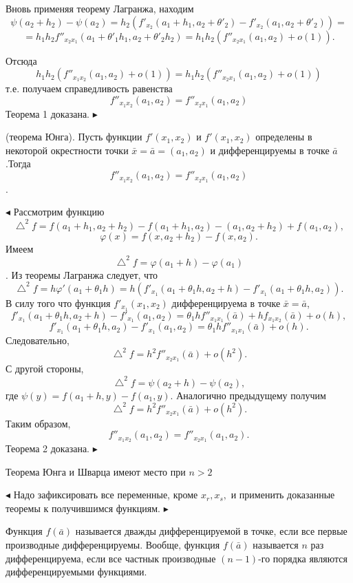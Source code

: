 \parindent=1cm
Вновь применяя теорему Лагранжа, находим
$$\psi (a_2+h_2)-\psi (a_2)=h_2(f'_{x_2}(a_1+h_1,a_2+\theta'_2)-f'_{x_2}(a_1,a_2+\theta'_2))=$$
$$=h_1 h_2 f''_{{x_2}{x_1}}(a_1+\theta'_1 h_1,a_2+\theta'_2 h_2)=h_1 h_2(f''_{{x_2}{x_1}}(a_1,a_2)+o(1)).$$

Отсюда
$$h_1 h_2(f''_{{x_1}{x_2}}(a_1, a_2)+o(1))=h_1 h_2(f''_{{x_2}{x_1}}(a_1, a_2)+o(1))$$
т.е. получаем справедливость равенства
$$f''_{{x_1}{x_2}}(a_1, a_2)=f''_{{x_2}{x_1}}(a_1, a_2)$$
Теорема 1 доказана.
$\blacktriangleright$

\begin{theorem}
(теорема Юнга). Пусть функции $f'(x_1, x_2)$ и $f'(x_1, x_2)$ определены в некоторой окрестности точки $\bar{x}=\bar{a}=(a_1, a_2)$
и дифференцируемы в точке $\bar{a}$.Тогда $$f''_{{x_1}{x_2}}(a_1, a_2)=f''_{{x_2}{x_1}}(a_1, a_2)$$.
\end{theorem}
$\blacktriangleleft$
Рассмотрим функцию
$$\bigtriangleup^2 f=f(a_1+h_1,a_2+h_2)-f(a_1+h_1,a_2)-(a_1,a_2+h_2)+f(a_1,a_2),$$
$$ \varphi (x)=f(x,a_2+h_2)-f(x,a_2).$$
Имеем
$$\bigtriangleup^2 f=\varphi (a_1+h)- \varphi (a_1)$$.
Из теоремы Лагранжа следует, что
$$\bigtriangleup^2 f=h \varphi' (a_1+\theta_1 h)=h(f'_{x_1}(a_1+\theta_1 h, a_2+h)-f'_{x_1}(a_1+\theta_1 h, a_2)).$$
В силу того что функция $f'_{x_1}(x_1, x_2)$ дифференцируема в точке $\bar{x}=\bar{a}$, 
$$f'_{x_1}(a_1+\theta_1 h, a_2+h)-f'_{x_1}(a_1, a_2)=\theta_1 h f''_{{x_1}{x_1}}(\bar{a})+h f_{{x_1}{x_2}}(\bar{a})+o(h),$$
$$ f'_{x_1}(a_1+\theta_1 h, a_2)-f'_{x_1}(a_1, a_2)=\theta_1 h f''_{{x_1}{x_1}}(\bar{a})+o(h).$$
Следовательно,
$$\bigtriangleup^2 f=h^2 f''_{{x_2}{x_1}}(\bar{a})+o(h^2).$$
С другой стороны,
$$\bigtriangleup^2 f=\psi (a_2+h)-\psi (a_2), $$
где $\psi(y)=f(a_1+h, y)-f(a_1, y).$ Аналогично предыдущему получим
$$\bigtriangleup^2 f=h^2 f''_{{x_2}{x_1}}(\bar{a})+o(h^2).$$
Таким образом,
$$f''_{{x_1}{x_2}}(a_1, a_2)=f''_{{x_2}{x_1}}(a_1, a_2).$$
Теорема 2 доказана.
$\blacktriangleright$
\begin{theorem}
Теорема Юнга и Шварца имеют место при $n>2$
\end{theorem}
$\blacktriangleleft$
Надо зафиксировать все переменные, кроме $x_r, x_s, $ и применить доказанные теоремы к получившимся функциям.
$\blacktriangleright$
\begin{object}
Функция $f(\bar{a})$ называется дважды дифференцируемой в точке, если все первые производные дифференцируемы. Вообще, функция $f(\bar{a})$
называется $n$ раз дифференцируема, если все частнык производные $(n-1)$-го порядка являются дифференцируемыми функциями.
\end{object}

